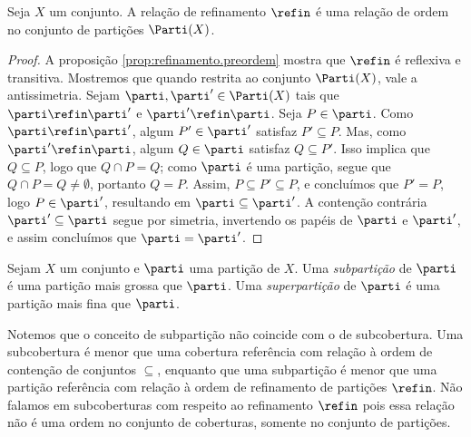 \begin{proposition}
\label{prop:refinamento.particao.ordem}
Seja $X$ um conjunto. A relação de refinamento $\refin$ é uma relação de ordem no conjunto de partições $\Parti(X)$.
\end{proposition}
\begin{proof}
A proposição \ref{prop:refinamento.preordem} mostra que $\refin$ é reflexiva e transitiva. Mostremos que quando restrita ao conjunto $\Parti(X)$, vale a antissimetria. Sejam $\parti, \parti' \in \Parti(X)$ tais que $\parti \refin \parti'$ e $\parti' \refin \parti$. Seja $P \in \parti$. Como $\parti \refin \parti'$, algum $P' \in \parti'$ satisfaz $P' \subseteq P$. Mas, como $\parti' \refin \parti$, algum $Q \in \parti$ satisfaz $Q \subseteq P'$. Isso implica que $Q \subseteq P$, logo que $Q \cap P = Q$; como $\parti$ é uma partição, segue que $Q \cap P = Q \neq \emptyset$, portanto $Q = P$. Assim, $P \subseteq P' \subseteq P$, e concluímos que $P' = P$, logo $P \in \parti'$, resultando em $\parti \subseteq \parti'$. A contenção contrária $\parti' \subseteq \parti$ segue por simetria, invertendo os papéis de $\parti$ e $\parti'$, e assim concluímos que $\parti = \parti'$.
\end{proof}

\begin{definition}
Sejam $X$ um conjunto e $\parti$ uma partição de $X$. Uma \emph{subpartição} de $\parti$ é uma partição mais grossa que $\parti$. Uma \emph{superpartição} de $\parti$ é uma partição mais fina que $\parti$.
\end{definition}

Notemos que o conceito de subpartição não coincide com o de subcobertura. Uma subcobertura é menor que uma cobertura referência com relação à ordem de contenção de conjuntos $\subseteq$, enquanto que uma subpartição é menor que uma partição referência com relação à ordem de refinamento de partições $\refin$. Não falamos em subcoberturas com respeito ao refinamento $\refin$ pois essa relação não é uma ordem no conjunto de coberturas, somente no conjunto de partições.

